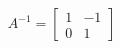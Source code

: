\documentclass[preview]{standalone}
\begin{document}
\begin{align*}
A^{-1} = \begin{bmatrix} 1 & -1 \\ 0 & 1 \end{bmatrix}
\end{align*}
\end{document}
